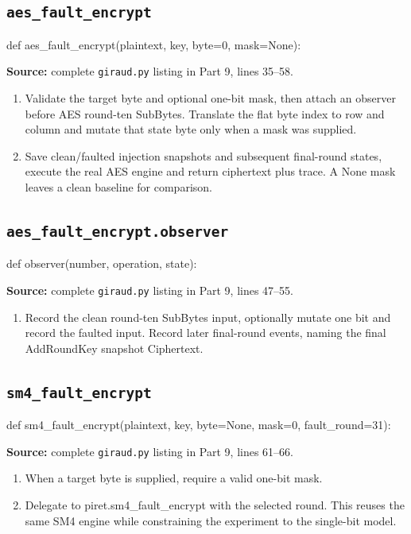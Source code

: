 \subsection{\texttt{aes\_\allowbreak{}fault\_\allowbreak{}encrypt}}
\begin{lightcode}
def aes_fault_encrypt(plaintext, key, byte=0, mask=None):
\end{lightcode}
\noindent\textbf{Source:} complete \texttt{giraud.py} listing in Part 9, lines 35--58.
\begin{enumerate}
\item Validate the target byte and optional one-bit mask, then attach an observer before AES round-ten SubBytes. Translate the flat byte index to row and column and mutate that state byte only when a mask was supplied.
\item Save clean/faulted injection snapshots and subsequent final-round states, execute the real AES engine and return ciphertext plus trace. A None mask leaves a clean baseline for comparison.
\end{enumerate}
\subsection{\texttt{aes\_\allowbreak{}fault\_\allowbreak{}encrypt.observer}}
\begin{lightcode}
def observer(number, operation, state):
\end{lightcode}
\noindent\textbf{Source:} complete \texttt{giraud.py} listing in Part 9, lines 47--55.
\begin{enumerate}
\item Record the clean round-ten SubBytes input, optionally mutate one bit and record the faulted input. Record later final-round events, naming the final AddRoundKey snapshot Ciphertext.
\end{enumerate}
\subsection{\texttt{sm4\_\allowbreak{}fault\_\allowbreak{}encrypt}}
\begin{lightcode}
def sm4_fault_encrypt(plaintext, key, byte=None, mask=0, fault_round=31):
\end{lightcode}
\noindent\textbf{Source:} complete \texttt{giraud.py} listing in Part 9, lines 61--66.
\begin{enumerate}
\item When a target byte is supplied, require a valid one-bit mask.
\item Delegate to piret.sm4\_fault\_encrypt with the selected round. This reuses the same SM4 engine while constraining the experiment to the single-bit model.
\end{enumerate}
